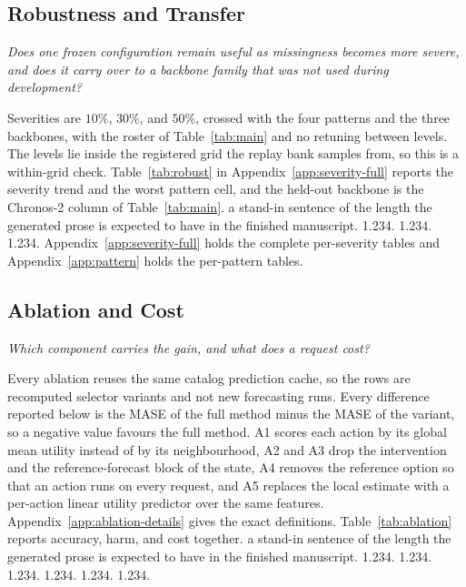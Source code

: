 \documentclass{article}
\begin{document}
\subsection{Robustness and Transfer}
\label{sec:exp-robust}
\emph{Does one frozen configuration remain useful as missingness becomes more severe, and does
it carry over to a backbone family that was not used during development?}

Severities are $10\%$, $30\%$, and $50\%$, crossed with the four patterns and the three
backbones, with the roster of Table~\ref{tab:main} and no retuning between levels. The levels
lie inside the registered grid the replay bank samples from, so this is a within-grid check.
Table~\ref{tab:robust} in Appendix~\ref{app:severity-full} reports the severity trend and the worst pattern cell, and the
held-out backbone is the Chronos-2 column of Table~\ref{tab:main}.
a stand-in sentence of the length the generated prose is expected to have in the finished manuscript. 1.234. 1.234. 1.234.
Appendix~\ref{app:severity-full} holds the complete per-severity tables and
Appendix~\ref{app:pattern} holds the per-pattern tables.
\subsection{Ablation and Cost}
\label{sec:exp-ablation}
\emph{Which component carries the gain, and what does a request cost?}

Every ablation reuses the same catalog prediction cache, so the rows are recomputed selector
variants and not new forecasting runs. Every difference reported below is the MASE of the full
method minus the MASE of the variant, so a negative value favours the full method. A1 scores each action by its global mean utility
instead of by its neighbourhood, A2 and A3 drop the intervention and the reference-forecast
block of the state, A4 removes the reference option so that an action runs on every request,
and A5 replaces the local estimate with a per-action linear utility predictor over the same
features. Appendix~\ref{app:ablation-details} gives the exact definitions.
Table~\ref{tab:ablation} reports accuracy, harm, and cost together. a stand-in sentence of the length the generated prose is expected to have in the finished manuscript. 1.234. 1.234. 1.234.
1.234. 1.234. 1.234.
\end{document}
